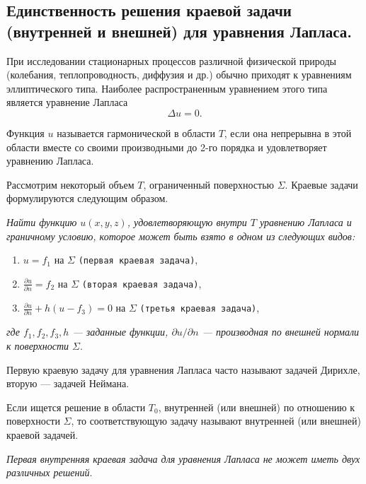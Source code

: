 \subsection{Единственность решения краевой задачи (внутренней и внешней) для уравнения Лапласа.}

При исследовании стационарных процессов различной физической природы (колебания, теплопроводность, диффузия и др.) обычно приходят к уравнениям эллиптического типа. Наиболее распространенным уравнением этого типа является уравнение Лапласа
\begin{equation*}
	\Delta u = 0. 
\end{equation*}

Функция $u$ называется гармонической в области $T$, если она непрерывна в этой области вместе со своими производными до 2-го порядка и удовлетворяет уравнению Лапласа. 

Рассмотрим некоторый объем $T$, ограниченный поверхностью $\Sigma$.
Краевые задачи формулируются следующим образом.

\textit{Найти функцию $u(x, y, z)$, удовлетворяющую внутри $T$ уравнению Лапласа и граничному условию, которое может быть взято в одном из следующих видов:} 
\begin{enumerate}
	\item $u = f_1 $ на $ \Sigma $ \quad \quad \quad \quad \quad \quad \quad \quad \texttt{(первая краевая задача)},
	
	\item $\frac{\partial u}{\partial n} = f_2$ на $ \Sigma $ \quad \quad \quad \quad \quad \quad \quad \texttt{(вторая краевая задача)},
	
	\item $\frac{\partial u}{\partial n} + h(u - f_3) = 0$ на $ \Sigma $ \quad \quad \texttt{(третья краевая задача)},
\end{enumerate}
\textit{где $f_1, f_2, f_3, h$ --- заданные функции, $\partial u / \partial n$ --- производная по внешней нормали к поверхности $\Sigma$}.

Первую краевую задачу для уравнения Лапласа часто называют задачей Дирихле, вторую --- задачей Неймана.

Если ищется решение в области $T_0$, внутренней (или внешней) по отношению к поверхности $\Sigma$, то соответствующую задачу называют внутренней (или внешней) краевой задачей. 

\textit{Первая внутренняя краевая задача для уравнения Лапласа не может иметь двух различных решений}.

